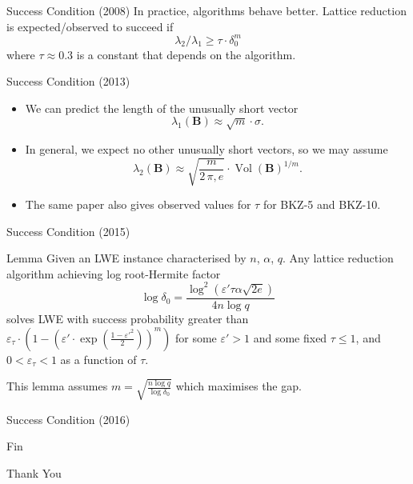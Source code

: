 \documentclass[presentation,smaller]{beamer}
\renewcommand{\vec}[1]{\mathbf{#1}\xspace}
\DeclareMathOperator{\Vol}{Vol}
\begin{document}
\begin{frame}[label={sec:org5145c77}]{Success Condition (2008)}
In practice, algorithms behave better. Lattice reduction is expected/observed  to succeed if \[λ_2/λ_1 ≥ τ ⋅ δ_0^m\] where \(τ ≈ 0.3\) is a constant that depends on the algorithm.
\end{frame}

\begin{frame}[label={sec:orgbb7d7ac}]{Success Condition (2013)}
\begin{itemize}
\item We can predict the length of the unusually short vector \[λ_1(\vec{B}) ≈ \sqrt{m} ⋅ σ.\]

\item In general, we expect no other unusually short vectors, so we may assume  \[λ_2(\vec{B}) ≈ \sqrt{\frac{m}{2\,π,e}} ⋅ \Vol(\vec{B})^{1/m}.\]

\item The same paper also gives observed values for \(τ\) for BKZ-5 and BKZ-10.
\end{itemize}
\end{frame}

\begin{frame}[label={sec:orga23329e}]{Success Condition (2015)}
\begin{block}{Lemma }
Given an LWE instance characterised by \(n\), \(α\), \(q\). Any lattice reduction algorithm achieving log root-Hermite factor \[\log{δ_0} = \frac{\log^2{\left(ε' τ α \sqrt{2e}\right)}}{4 n \log{q}}\] solves LWE with success probability greater than \(ε_τ ⋅ \left( 1-\left(ε' ⋅  \exp{\left(\frac{1-ε'^2}{2}\right)}\right)^m \right)\) for some \(ε' > 1\) and some fixed \(τ ≤ 1\), and \(0 < ε_τ < 1\) as a function of \(τ\).
\end{block}

This lemma assumes \(m = \sqrt{\frac{n \log q}{\log δ_0}}\) which maximises the gap.
\end{frame}

\begin{frame}[label={sec:org03e61b3}]{Success Condition (2016)}
\end{frame}



\begin{frame}[standout,label={sec:orgc2c3931}]{Fin}
\begin{center}
\Huge \alert{Thank You}
\end{center}
\end{frame}
\end{document}
